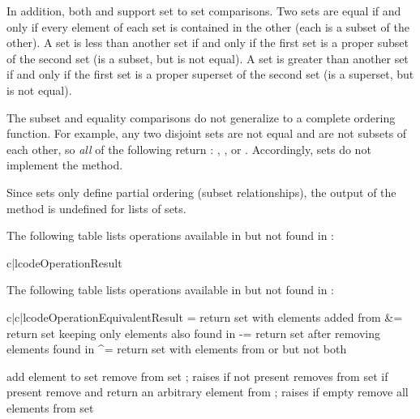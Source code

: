 In addition, both  and 
support set to set comparisons.  Two sets are equal if and only if
every element of each set is contained in the other (each is a subset
of the other).
A set is less than another set if and only if the first set is a proper
subset of the second set (is a subset, but is not equal).
A set is greater than another set if and only if the first set is a proper
superset of the second set (is a superset, but is not equal).

The subset and equality comparisons do not generalize to a complete
ordering function.  For example, any two disjoint sets are not equal and
are not subsets of each other, so \emph{all} of the following return
:  , , or
.
Accordingly, sets do not implement the  method.

Since sets only define partial ordering (subset relationships), the output
of the  method is undefined for lists of sets.

The following table lists operations available in 
but not found in :

\begin{tableii}{c|l}{code}{Operation}{Result}
\end{tableii}

The following table lists operations available in 
but not found in :

\begin{tableiii}{c|c|l}{code}{Operation}{Equivalent}{Result}
         { \textbar= }
         {return set  with elements added from }
         { \&= }
         {return set  keeping only elements also found in }
         { -= }
         {return set  after removing elements found in }
         { \textasciicircum= }
         {return set  with elements from  or 
          but not both}

  \hline
         {add element  to set }
         {remove  from set ; raises 
	  if not present}
         {removes  from set  if present}
         {remove and return an arbitrary element from ; raises
	   if empty}
         {remove all elements from set }
\end{tableiii}

